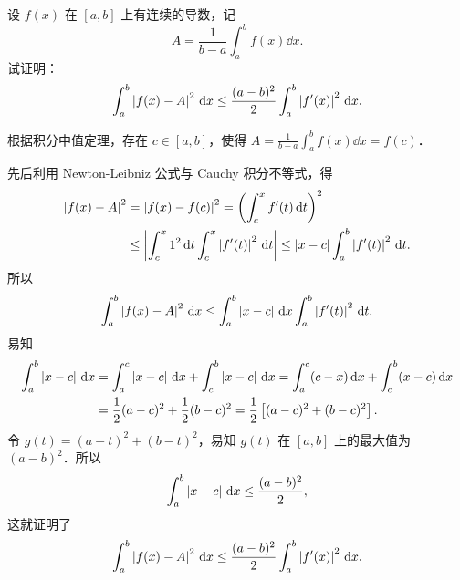 设 $f(x)$ 在 $[a,b]$ 上有连续的导数，记
\[
A=\frac{1}{b-a}\int_a^b f(x)\dd x.
\]
试证明：
\[
\int_a^b\left|f(x)-A\right|^2\,\mathrm{d} x\le\frac{(a-b)^2}{2}\int_a^b\left|f'(x)\right|^2\,\mathrm{d} x.
\]
\begin{solution}
根据积分中值定理，存在 $c\in[a,b]$，使得 $A=\frac{1}{b-a}\int_a^b f(x)\dd x=f(c)$．

先后利用 Newton-Leibniz 公式与 Cauchy 积分不等式，得
\begin{align*}
\left|f(x)-A\right|^2&=\left|f(x)-f(c)\right|^2=\left(\int_c^x f'(t)\,\mathrm{d} t\right)^2\\
&\le\left|\int_c^x 1^2\,\mathrm{d} t\int_c^x\left|f'(t)\right|^2\,\mathrm{d} t\right|\le\left|x-c\right|\int_a^b\left|f'(t)\right|^2\,\mathrm{d} t.
\end{align*}
所以
\[
\int_a^b\left|f(x)-A\right|^2\,\mathrm{d} x\le\int_a^b\left|x-c\right|\,\mathrm{d} x\int_a^b\left|f'(t)\right|^2\,\mathrm{d} t.
\]
易知
\begin{align*}
\int_a^b\left|x-c\right|\,\mathrm{d} x&=\int_a^c\left|x-c\right|\,\mathrm{d} x+\int_c^b\left|x-c\right|\,\mathrm{d} x=\int_a^c(c-x)\,\mathrm{d} x+\int_c^b(x-c)\,\mathrm{d} x\\
&=\frac{1}{2}(a-c)^2+\frac{1}{2}(b-c)^2=\frac{1}{2}\left[(a-c)^2+(b-c)^2\right].
\end{align*}
令 $g(t)=(a-t)^2+(b-t)^2$，易知 $g(t)$ 在 $[a,b]$ 上的最大值为 $(a-b)^2$．所以
\[
\int_a^b\left|x-c\right|\,\mathrm{d} x\le\frac{(a-b)^2}{2},
\]
这就证明了
\[
\int_a^b\left|f(x)-A\right|^2\,\mathrm{d} x\le\frac{(a-b)^2}{2}\int_a^b\left|f'(x)\right|^2\,\mathrm{d} x.
\]
\end{solution}
